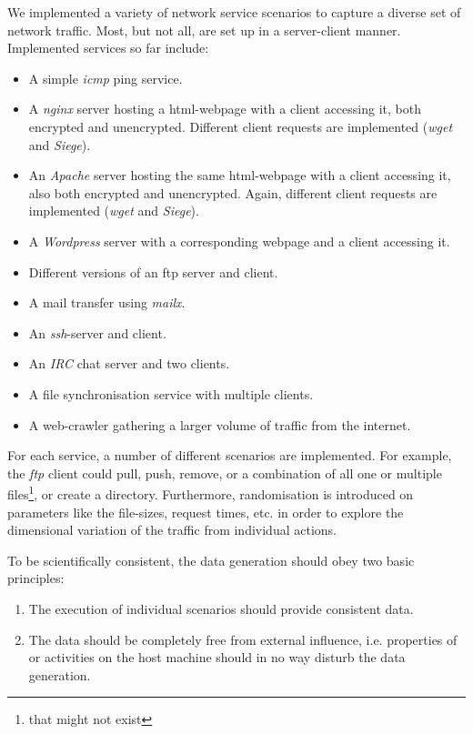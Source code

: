 \documentclass[a4paper,12pt,twoside]{report}
\begin{document}
We implemented a variety of network service  scenarios to capture a diverse set of network traffic. Most, but not all, are set up in a server-client manner. Implemented services so far include:

\begin{itemize}
\item A simple \textit{icmp} ping service.
\item A \textit{nginx} server hosting a html-webpage with a client accessing it, both encrypted and unencrypted. Different client requests are implemented (\textit{wget} and \textit{Siege}).
\item An \textit{Apache} server hosting the same html-webpage with a client accessing it, also both encrypted and unencrypted. Again, different client requests are implemented (\textit{wget} and \textit{Siege}).
\item A \textit{Wordpress} server with a corresponding webpage and a client accessing it.
\item Different versions of an ftp server and client.
\item A mail transfer using \textit{mailx}.
\item An \textit{ssh}-server and client.
\item An \textit{IRC} chat server and two clients.
\item A file synchronisation service with multiple clients.
\item A web-crawler gathering a larger volume of traffic from the internet.
\end{itemize}

For each service, a number of different scenarios are implemented. For example, the \textit{ftp} client could pull, push, remove, or a combination of all one or multiple files\footnote{that might not exist}, or create a directory. Furthermore, randomisation is introduced on parameters like the file-sizes, request times, etc. in order to explore the dimensional variation of the traffic from individual actions.

To be scientifically consistent, the data generation should obey two basic principles: 
\begin{enumerate}
\item The execution of individual scenarios should provide consistent data. 

\item The data should be completely free from external influence, i.e. properties of or activities on the host machine should in no way disturb the data generation.
\end{enumerate}
\end{document}
